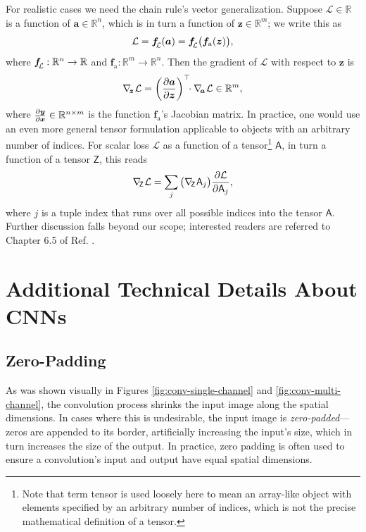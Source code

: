 \documentclass[11pt, a4paper]{article}
\renewcommand{\vec}[1]{\bm{#1}}
\newcommand{\tensor}[1]{\mathsf{#1}}
\renewcommand{\grad}{\nabla}
\newcommand{\z}{\vec{z}}
\renewcommand{\a}{\vec{a}}
\newcommand{\subgrad}[1]{\grad_{\mspace{-4mu}#1}\mspace{1mu}} %
\begin{document}
For realistic cases we need the chain rule's vector generalization. Suppose $ \mathcal{L} \in \mathbb{R} $ is a function of $ \a \in \mathbb{R}^{n} $, which is in turn a function of $ \z \in \mathbb{R}^{m} $; we write this as
\begin{equation*}
    \mathcal{L} = \vec{f}_{\raisebox{-0.4ex}{\scalebox{0.7}{$\mspace{-3mu} \mathcal{L}$}}} (\vec{a}) = \vec{f}_{\raisebox{-0.4ex}{\scalebox{0.7}{$\mspace{-3mu} \mathcal{L}$}}} \big( \vec{f}_{\text{a}} (\z) \big),
\end{equation*}
where $ \vec{f}_{\raisebox{-0.4ex}{\scalebox{0.7}{$\mspace{-3mu} \mathcal{L}$}}} : \mathbb{R}^{n} \to \mathbb{R} $ and $ \vec{f}_{\text{a}} : \mathbb{R}^{m} \to \mathbb{R}^{n} $. Then the gradient of $ \mathcal{L} $ with respect to $ \z $ is
    \begin{equation*}
        \subgrad{\z} \mathcal{L} = \left( \pdv{\a}{\z} \right)^{\top} \mspace{-7mu} \cdot \subgrad{\a} \mathcal{L} \in \mathbb{R}^{m},
    \end{equation*}
    where $ \pdv{\vec{y}}{\vec{x}} \in \mathbb{R}^{n \times m} $ is the function $ \vec{f}_{\text{a}} $'s Jacobian matrix. In practice, one would use an even more general tensor formulation applicable to objects with an arbitrary number of indices. For scalar loss $ \mathcal{L} $ as a function of a tensor\footnote{Note that term tensor is used loosely here to mean an array-like object with elements specified by an arbitrary number of indices, which is not the precise mathematical definition of a tensor.} $ \tensor{A} $, in turn a function of a tensor $ \tensor{Z} $, this reads
\begin{equation*}
    \subgrad{\tensor{Z}} \mathcal{L} = \sum_{j} \big( \subgrad{\tensor{Z}} \tensor{A}_{j} \big) \pdv{\mathcal{L}}{\tensor{A}_{j}},
\end{equation*}
where $ j $ is a tuple index that runs over all possible indices into the tensor $ \tensor{A} $. Further discussion falls beyond our scope; interested readers are referred to Chapter 6.5 of Ref. \cite{goodfellow}.

\section{Additional Technical Details About CNNs} \label{s:appendix-cnn}

\subsection{Zero-Padding}
As was shown visually in Figures \ref{fig:conv-single-channel} and \ref{fig:conv-multi-channel}, the convolution process shrinks the input image along the spatial dimensions. In cases where this is undesirable, the input image is \textit{zero-padded}---zeros are appended to its border, artificially increasing the input's size, which in turn increases the size of the output. In practice, zero padding is often used to ensure a convolution's input and output have equal spatial dimensions.
\end{document}
